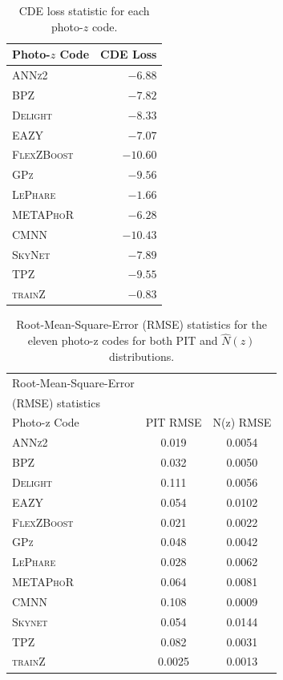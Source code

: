 \documentclass[usenatbib]{mn2e}
\newcommand{\trainz}{\textsc{trainZ}}
\begin{document}
\begin{table}  %
\centering
\caption{CDE loss statistic for each photo-$z$ code.} \label{tab:cdeloss}
\begin{tabular}{lr}
\hline
\bf Photo-$z$ Code & \bf CDE Loss \\
\hline
\textsc{ANNz2} 		& $-6.88$ \\
\textsc{BPZ} 		& $-7.82$ \\
\textsc{Delight}    & $-8.33$\\
\textsc{EAZY}       & $-7.07$ \\
\textsc{FlexZBoost} & $-10.60$\\
\textsc{GPz} 		& $-9.56$ \\
\textsc{LePhare} 	& $-1.66$ \\
\textsc{METAPhoR} 	& $-6.28$ \\
\textsc{CMNN}         & $-10.43$ \\
\textsc{SkyNet} 	& $-7.89$ \\
\textsc{TPZ} 		& $-9.55$ \\
\hline
\trainz		& $-0.83$ \\
\end{tabular}
\end{table}

\begin{table}
\setlength{\tabcolsep}{2pt}
\begin{center}
\caption{Root-Mean-Square-Error (RMSE) statistics for the eleven photo-z codes for both PIT and $\hat{N}(z)$ distributions.}\label{tab:rmse}
\begin{tabular}{lcc}
\hline
\hline
Root-Mean-Square-Error \\
(RMSE) statistics \\
\hline
Photo-z Code & PIT RMSE & N(z) RMSE\\
\hline
\textsc{ANNz2}      & 0.019 & 0.0054\\
\textsc{BPZ}        & 0.032 & 0.0050\\
\textsc{Delight}    & 0.111 & 0.0056\\
\textsc{EAZY}       & 0.054 & 0.0102\\
\textsc{FlexZBoost} & 0.021 & 0.0022\\
\textsc{GPz}        & 0.048 & 0.0042\\
\textsc{LePhare}    & 0.028 & 0.0062\\
\textsc{METAPhoR}   & 0.064 & 0.0081\\
\textsc{CMNN}         & 0.108 & 0.0009\\
\textsc{Skynet}     & 0.054 & 0.0144\\ 
\textsc{TPZ}        & 0.082 & 0.0031\\
\hline
\trainz		& 0.0025 & 0.0013\\
\end{tabular}
\end{center} 
\end{table}
\end{document}

